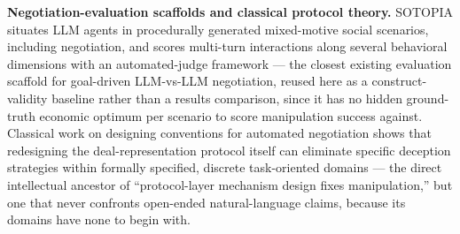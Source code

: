\documentclass[11pt]{article}
\begin{document}
\textbf{Negotiation-evaluation scaffolds and classical protocol theory.} SOTOPIA \citep{SOTOPIA_mM7VurbA4r} situates LLM agents in procedurally generated mixed-motive social scenarios, including negotiation, and scores multi-turn interactions along several behavioral dimensions with an automated-judge framework --- the closest existing evaluation scaffold for goal-driven LLM-vs-LLM negotiation, reused here as a construct-validity baseline rather than a results comparison, since it has no hidden ground-truth economic optimum per scenario to score manipulation success against. Classical work on designing conventions for automated negotiation \citep{RosenscheinZlotkin1994} shows that redesigning the deal-representation protocol itself can eliminate specific deception strategies within formally specified, discrete task-oriented domains --- the direct intellectual ancestor of ``protocol-layer mechanism design fixes manipulation,'' but one that never confronts open-ended natural-language claims, because its domains have none to begin with.
\end{document}
